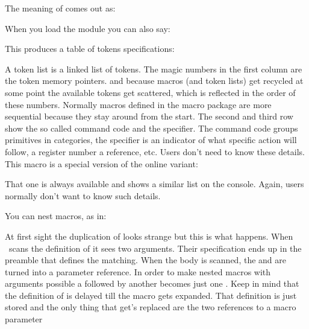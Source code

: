 The meaning of \type {\foo} comes out as:

\startnarrower \getbuffer[definition] \stopnarrower

When you load the module  you can also say:

\startbuffer[example]
\luatokentable\foo
\stopbuffer

\typebuffer[example][option=TEX]

This produces a table of tokens specifications:

{\getbuffer[definition]\getbuffer[example]}

A token list is a linked list of tokens. The magic numbers in the first column
are the token memory pointers. and because macros (and token lists) get recycled
at some point the available tokens get scattered, which is reflected in the order
of these numbers. Normally macros defined in the macro package are more sequential
because they stay around from the start. The second and third row show the so
called command code and the specifier. The command code groups primitives in
categories, the specifier is an indicator of what specific action will follow, a
register number a reference, etc. Users don't need to know these details. This
macro is a special version of the online variant:

\starttyping[option=TEX]
\showluatokens\foo
\stoptyping

That one is always available and shows a similar list on the console. Again, users
normally don't want to know such details.

\stopsectionlevel

\startsectionlevel[title=nesting]

You can nest macros, as in:

\startbuffer
\def\foo#1#2{\def\oof##1{<#1>##1<#2>}}
\stopbuffer

\typebuffer[option=TEX] \getbuffer

At first sight the duplication of \type {#} looks strange but this is what
happens. When \TEX\ scans the definition of \type {\foo} it sees two arguments.
Their specification ends up in the preamble that defines the matching. When the
body is scanned, the  and  are turned into a parameter
reference. In order to make nested macros with arguments possible a \type {#}
followed by another \type {#} becomes just one \type {#}. Keep in mind that the
definition of \type {\oof} is delayed till the macro \type {\foo} gets expanded.
That definition is just stored and the only thing that get's replaced are the two
references to a macro parameter


